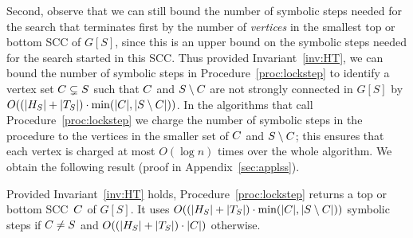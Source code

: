 \vspace{-1mm}
\smallskip{}
Second, observe that we can still bound the number of symbolic steps needed for 
the search that terminates first by the 
number of \emph{vertices} in the smallest top or bottom SCC of $G[S]$, since this 
is an upper bound on the symbolic steps needed for the search started 
in this SCC. Thus provided Invariant~\ref{inv:HT},
we can bound the number of symbolic steps in Procedure~\ref{proc:lockstep}
to identify a vertex set $C \subsetneq S$ such that $C$ and $S \setminus C$
are not strongly connected in $G[S]$
by $O((\lvert H_S \rvert + \lvert T_S \rvert) \cdot \min(\lvert C \rvert, \lvert S \setminus C \rvert))$.
In the algorithms that call Procedure~\ref{proc:lockstep} we charge the 
number of symbolic steps in the procedure to the vertices in the smaller 
set of $C$ and $S \setminus C$; this ensures that each 
vertex is charged at most $O(\log{n})$ times over the whole algorithm.
We obtain the following result (proof in Appendix~\ref{sec:applss}).

\vspace{-1mm}
\begin{thm}\label{thm:lss}
	Provided Invariant~\ref{inv:HT} holds, 
	Procedure~\ref{proc:lockstep}
	returns a top or bottom SCC~$C$ of $G[S]$. It uses $O((\lvert H_S \rvert 
	+ \lvert T_S \rvert) \cdot \min(\lvert C \rvert, \lvert S \setminus C \rvert))$  symbolic steps
	if $C \ne S$ and $O((\lvert H_S \rvert + \lvert T_S \rvert) \cdot \lvert C \rvert)$ otherwise.
\end{thm}
